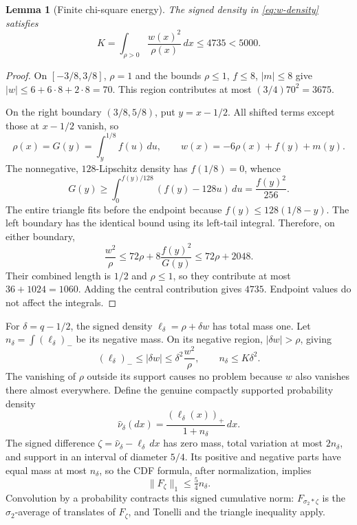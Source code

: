 \documentclass[11pt,letterpaper]{article}
\newtheorem{lemma}[theorem]{Lemma}
\theoremstyle{remark}\newtheorem{remark}[theorem]{Remark}
\begin{document}
\begin{lemma}[Finite chi-square energy]\label{lem:energy}
The signed density in \eqref{eq:w-density} satisfies
\[
K=\int_{\rho>0}\frac{w(x)^2}{\rho(x)}\,dx\le4735<5000.
\]
\end{lemma}
\begin{proof}
On $[-3/8,3/8]$, $\rho=1$ and the bounds $\rho\le1$, $f\le8$, $|m|\le8$ give $|w|\le6+6\cdot8+2\cdot8=70$. This region contributes at most $(3/4)70^2=3675$.

On the right boundary $(3/8,5/8)$, put $y=x-1/2$. All shifted terms except those at $x-1/2$ vanish, so
\[
\rho(x)=G(y)=\int_y^{1/8}f(u)\,du,\qquad
w(x)=-6\rho(x)+f(y)+m(y).
\]
The nonnegative, $128$-Lipschitz density has $f(1/8)=0$, whence
\[
G(y)\ge\int_0^{f(y)/128}(f(y)-128u)\,du=\frac{f(y)^2}{256}.
\]
The entire triangle fits before the endpoint because $f(y)\le128(1/8-y)$. The left boundary has the identical bound using its left-tail integral. Therefore, on either boundary,
\[
\frac{w^2}{\rho}\le72\rho+8\frac{f(y)^2}{G(y)}\le72\rho+2048.
\]
Their combined length is $1/2$ and $\rho\le1$, so they contribute at most $36+1024=1060$. Adding the central contribution gives $4735$. Endpoint values do not affect the integrals.
\end{proof}

For $\delta=q-1/2$, the signed density $\ell_\delta=\rho+\delta w$ has total mass one. Let $n_\delta=\int(\ell_\delta)_-$ be its negative mass. On its negative region, $|\delta w|>\rho$, giving
\[
(\ell_\delta)_-\le|\delta w|\le\delta^2\frac{w^2}{\rho},
\qquad n_\delta\le K\delta^2.
\]
The vanishing of $\rho$ outside its support causes no problem because $w$ also vanishes there almost everywhere. Define the genuine compactly supported probability density
\begin{equation}\label{eq:clipped}
\widehat\nu_\delta(dx)=\frac{(\ell_\delta(x))_+}{1+n_\delta}\,dx.
\end{equation}
The signed difference $\zeta=\widehat\nu_\delta-\ell_\delta\,dx$ has zero mass, total variation at most $2n_\delta$, and support in an interval of diameter $5/4$. Its positive and negative parts have equal mass at most $n_\delta$, so the CDF formula, after normalization, implies
\[
\|F_\zeta\|_1\le\tfrac54n_\delta.
\]
Convolution by a probability contracts this signed cumulative norm: $F_{\sigma_2*\zeta}$ is the $\sigma_2$-average of translates of $F_\zeta$, and Tonelli and the triangle inequality apply.
\end{document}
